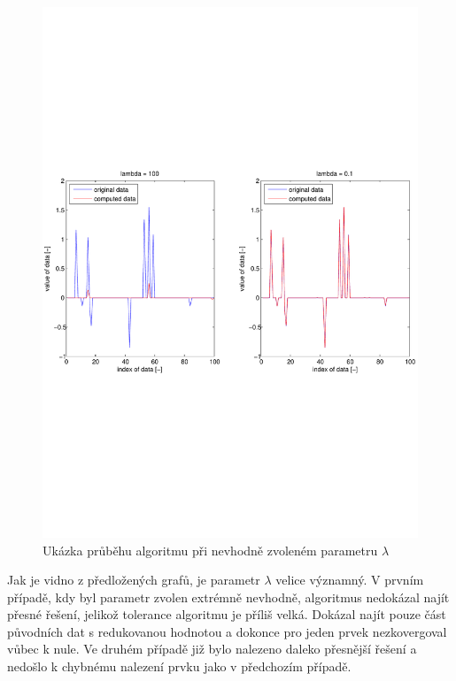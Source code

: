 \documentclass[FM,BP]{tulthesis}
\begin{document}
\begin{figure}[!ht]
	\begin{center}
		\includegraphics[scale=0.72]{obr/lambda.pdf}
	\end{center}
	\caption{Ukázka průběhu algoritmu při nevhodně zvoleném parametru $\lambda$}
	\label{fig:basicLambda}
\end{figure}

Jak je vidno z předložených grafů, je parametr $\lambda$ velice významný. V prvním případě, kdy byl parametr zvolen extrémně nevhodně, algoritmus nedokázal najít přesné řešení, jelikož tolerance algoritmu je příliš velká. Dokázal najít pouze část původních dat s redukovanou hodnotou a dokonce pro jeden prvek nezkovergoval vůbec k nule. Ve druhém případě již bylo nalezeno daleko přesnější řešení a nedošlo k chybnému nalezení prvku jako v předchozím případě.
\end{document}

